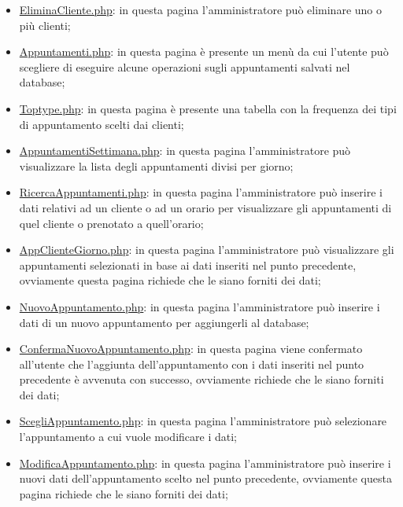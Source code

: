{\begin{itemize}
		\item \href{http://tecweb2016.studenti.math.unipd.it/smarches/EliminaCliente.php}{EliminaCliente.php}: in questa pagina l'amministratore può eliminare uno o più clienti;
		\item \href{http://tecweb2016.studenti.math.unipd.it/smarches/Appuntamenti.php}{Appuntamenti.php}: in questa pagina è presente un menù da cui l'utente può scegliere di eseguire alcune operazioni sugli appuntamenti salvati nel database;
		\item \href{http://tecweb2016.studenti.math.unipd.it/smarches/Toptype.php}{Toptype.php}: in questa pagina è presente una tabella con la frequenza dei tipi di appuntamento scelti dai clienti;
		\item \href{http://tecweb2016.studenti.math.unipd.it/smarches/AppuntamentiSettimana.php}{AppuntamentiSettimana.php}: in questa pagina l'amministratore può visualizzare la lista degli appuntamenti divisi per giorno;
		\item \href{http://tecweb2016.studenti.math.unipd.it/smarches/RicercaAppuntamenti.php}{RicercaAppuntamenti.php}: in questa pagina l'amministratore può inserire i dati relativi ad un cliente o ad un orario per visualizzare gli appuntamenti di quel cliente o prenotato a quell'orario;
		\item \underline{AppClienteGiorno.php}: in questa pagina l'amministratore può visualizzare gli appuntamenti selezionati in base ai dati inseriti nel punto precedente, ovviamente questa pagina richiede che le siano forniti dei dati;
		\item \href{http://tecweb2016.studenti.math.unipd.it/smarches/NuovoAppuntamento.php}{NuovoAppuntamento.php}: in questa pagina l'amministratore può inserire i dati di un nuovo appuntamento per aggiungerli al database;
		\item \underline{ConfermaNuovoAppuntamento.php}: in questa pagina viene confermato all'utente che l'aggiunta dell'appuntamento con i dati inseriti nel punto precedente è avvenuta con successo, ovviamente richiede che le siano forniti dei dati;
		\item \href{http://tecweb2016.studenti.math.unipd.it/smarches/ScegliAppuntamento.php}{ScegliAppuntamento.php}: in questa pagina l'amministratore può selezionare l'appuntamento a cui vuole modificare i dati;
		\item \underline{ModificaAppuntamento.php}: in questa pagina l'amministratore può inserire i nuovi dati dell'appuntamento scelto nel punto precedente, ovviamente questa pagina richiede che le siano forniti dei dati;

\end{itemize}}
